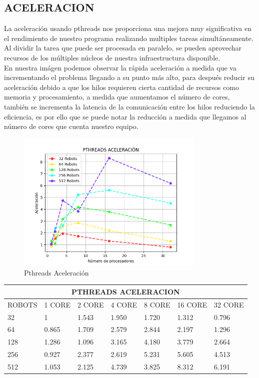 \documentclass[oneside,twocolumn]{article}
\begin{document}
\newpage
\subsection{ACELERACION}

La aceleración usando pthreads nos proporciona una mejora muy significativa en el rendimiento de nuestro programa realizando multiples tareas simultáneamente. Al dividir la tarea que puede ser procesada en paralelo, se pueden aprovechar recursos de los múltiples núcleos de nuestra infraestructura disponible.\\

En nuestra imágen podemos observar la rápida aceleración a medida que va incrementando el problema llegando a su punto más alto, para después reducir su aceleración debido a que los hilos requieren cierta cantidad de recursos como memoria y procesamiento, a medida que aumentamos el número de cores, también se incrementa la latencia de la comunicación entre los hilos reduciendo la eficiencia, es por ello que se puede notar la reducción a medida que llegamos al número de cores que cuenta nuestro equipo.

\begin{figure}[h]
    \centering
    \includegraphics[width=0.80\textwidth]{graficos/pthreads/pth_acc.png}
    \caption{Pthreads Aceleración}
    \label{fig:secuencial}
\end{figure}

\begin{center}
\begin{tabular}{ |p{2cm}||p{2cm}||p{2cm}||p{2cm}||p{2cm}||p{2cm}||p{2cm}| }
 \hline
 \multicolumn{7}{|c|}{PTHREADS ACELERACION} \\
 \hline
 ROBOTS & 1 CORE & 2 CORE & 4 CORE & 8 CORE & 16 CORE & 32 CORE\\
 \hline
 32   & 1     & 1.543 & 1.950 & 1.720 & 1.312 & 0.796\\ \hline
 64   & 0.865 & 1.709 & 2.579 & 2.844 & 2.197 & 1.296\\ \hline
 128  & 1.286 & 1.096 & 3.165 & 4.180 & 3.779 & 2.664\\ \hline
 256  & 0.927 & 2.377 & 2.619 & 5.231 & 5.605 & 4.513\\ \hline
 512  & 1.053 & 2.125 & 4.739 & 3.825 & 8.312 & 6.191\\ \hline
 \hline
\end{tabular}
\end{center}
\end{document}
